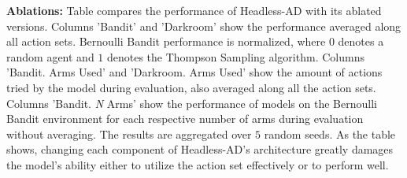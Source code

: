 \documentclass{article}
\theoremstyle{plain}
\theoremstyle{definition}
\theoremstyle{remark}
\begin{document}
\begin{table}[!t]
\centering
\caption{\textbf{Ablations:} Table compares the performance of Headless-AD with its ablated versions. Columns 'Bandit' and 'Darkroom' show the performance averaged along all action sets. Bernoulli Bandit performance is normalized, where $0$ denotes a random agent and $1$ denotes the Thompson Sampling algorithm. Columns 'Bandit. Arms Used' and 'Darkroom. Arms Used' show the amount of actions tried by the model during evaluation, also averaged along all the action sets. Columns 'Bandit. \textit{N} Arms' show the performance of models on the Bernoulli Bandit environment for each respective number of arms during evaluation without averaging. The results are aggregated over $5$ random seeds. As the table shows, changing each component of Headless-AD's architecture greatly damages the model's ability either to utilize the action set effectively or to perform well.}
\label{table:ablations}
\vspace{-10pt}
\end{table}
\end{document}
